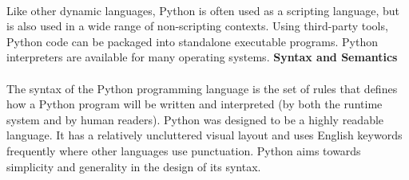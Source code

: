 \paragraph{} Like other dynamic languages, Python is often used as a scripting language, but is also used in a wide range of non-scripting contexts. Using third-party tools, Python code can be packaged into standalone executable programs. Python interpreters are available for many operating systems.
\textbf{Syntax and Semantics}
\paragraph{} The syntax of the Python programming language is the set of rules that defines how a Python program will be written and interpreted (by both the runtime system and by human readers). Python was designed to be a highly readable language. It has a relatively uncluttered visual layout and uses English keywords frequently where other languages use punctuation. Python aims towards simplicity and generality in the design of its syntax.

